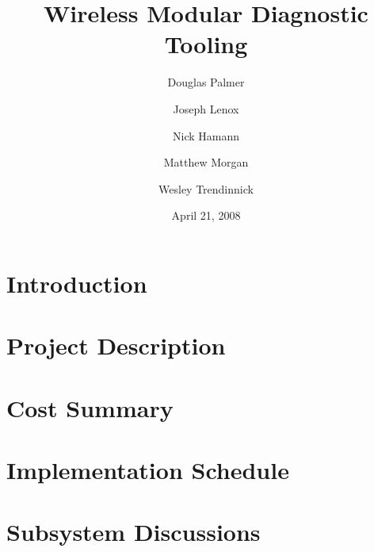 \documentclass[]{report}
\title{Wireless Modular Diagnostic Tooling}
\author{Douglas Palmer \and Joseph Lenox \and Nick Hamann \and Matthew Morgan \and Wesley Trendinnick}
\date{April 21, 2008}
\begin{document}
\maketitle



\tableofcontents

\chapter{Introduction}


\chapter{Project Description}


\chapter{Cost Summary}


\chapter{Implementation Schedule}


\chapter{Subsystem Discussions}







\fancyfoot[R]{}
\begin{appendix}
%


\fancyfoot[R]{}


\fancyfoot[R]{}


\listoffigures
{}
\listoftables
\end{appendix}



\printindex
\end{document}
